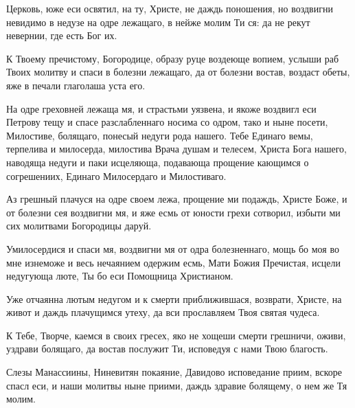 \begin{mymulticols}
\slava

Церковь, юже еси освятил, на ту, Христе, не даждь поношения, но воздвигни невидимо в недузе на одре лежащаго, в нейже молим Ти ся: да не рекут невернии, где есть Бог их.

\inyne

К Твоему пречистому, Богородице, образу руце воздеюще вопием, услыши раб Твоих молитву и спаси в болезни лежащаго, да от болезни востав, воздаст обеты, яже в печали глаголаша уста его.




На одре греховней лежаща мя, и страстьми уязвена, и якоже воздвигл еси Петрову тещу и спасе разслабленнаго носима со одром, тако и ныне посети, Милостиве, болящаго, понесый недуги рода нашего. Тебе Единаго вемы, терпелива и милосерда, милостива Врача душам и телесем, Христа Бога нашего, наводяща недуги и паки исцеляюща, подавающа прощение кающимся о согрешениих, Единаго Милосердаго и Милостиваго.

\slava

Аз грешный плачуся на одре своем лежа, прощение ми подаждь, Христе Боже, и от болезни сея воздвигни мя, и яже есмь от юности грехи сотворил, избыти ми сих молитвами Богородицы даруй.

\inyne

Умилосердися и спаси мя, воздвигни мя от одра болезненнаго, мощь бо моя во мне изнеможе и весь нечаянием одержим есмь, Мати Божия Пречистая, исцели недугующа люте, Ты бо еси Помощница Христианом.






Уже отчаянна лютым недугом и к смерти приближившася, возврати, Христе, на живот и даждь плачущимся утеху, да вси прославляем Твоя святая чудеса.


К Тебе, Творче, каемся в своих гресех, яко не хощеши смерти грешничи, оживи, уздрави болящаго, да востав послужит Ти, исповедуя с нами Твою благость.

\slava

Слезы Манассиины, Ниневитян покаяние, Давидово исповедание приим, вскоре спасл еси, и наши молитвы ныне приими, даждь здравие болящему, о нем же Тя молим.


\end{mymulticols}

